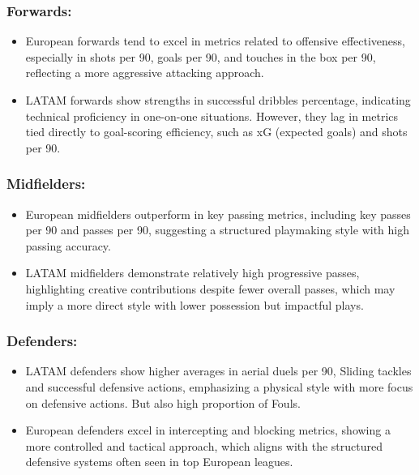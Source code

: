 \documentclass[11pt]{article}
\providecommand{\tightlist}{%
      \setlength{\itemsep}{0pt}\setlength{\parskip}{0pt}}
\begin{document}
    \subsubsection{Forwards:}\label{forwards}

\begin{itemize}
\tightlist
\item
  European forwards tend to excel in metrics related to offensive
  effectiveness, especially in shots per 90, goals per 90, and touches
  in the box per 90, reflecting a more aggressive attacking approach.
\item
  LATAM forwards show strengths in successful dribbles percentage,
  indicating technical proficiency in one-on-one situations. However,
  they lag in metrics tied directly to goal-scoring efficiency, such as
  xG (expected goals) and shots per 90.
\end{itemize}

\subsubsection{Midfielders:}\label{midfielders}

\begin{itemize}
\tightlist
\item
  European midfielders outperform in key passing metrics, including key
  passes per 90 and passes per 90, suggesting a structured playmaking
  style with high passing accuracy.
\item
  LATAM midfielders demonstrate relatively high progressive passes,
  highlighting creative contributions despite fewer overall passes,
  which may imply a more direct style with lower possession but
  impactful plays.
\end{itemize}

\subsubsection{Defenders:}\label{defenders}

\begin{itemize}
\tightlist
\item
  LATAM defenders show higher averages in aerial duels per 90, Sliding
  tackles and successful defensive actions, emphasizing a physical style
  with more focus on defensive actions. But also high proportion of
  Fouls.
\item
  European defenders excel in intercepting and blocking metrics, showing
  a more controlled and tactical approach, which aligns with the
  structured defensive systems often seen in top European leagues.
\end{itemize}
\end{document}
